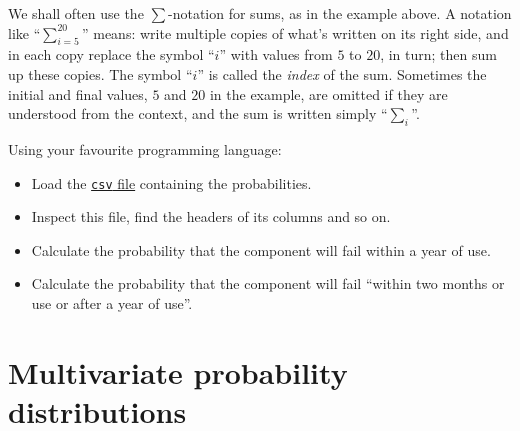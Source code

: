 \documentclass[
  a4paper,
  DIV=11,
  numbers=noendperiod,
  oneside]{scrreprt}
\providecommand{\tightlist}{%
  \setlength{\itemsep}{0pt}\setlength{\parskip}{0pt}}\usepackage{longtable,booktabs,array}
\begin{document}
\begin{tcolorbox}[enhanced jigsaw, opacityback=0, colbacktitle=quarto-callout-note-color!10!white, leftrule=.75mm, colframe=quarto-callout-note-color-frame, titlerule=0mm, rightrule=.15mm, toprule=.15mm, left=2mm, breakable, opacitybacktitle=0.6, toptitle=1mm, bottomtitle=1mm, coltitle=black, arc=.35mm, colback=white, title={Sum notation}, bottomrule=.15mm]

We shall often use the \(\sum\)-notation for sums, as in the example
above. A notation like {``\(\displaystyle\sum_{i=5}^{20}\)''} means:
write multiple copies of what's written on its right side, and in each
copy replace the symbol {``\(i\)''} with values from \(5\) to {\(20\),}
in turn; then sum up these copies. The symbol {``\(i\)''} is called the
\emph{index} of the sum. Sometimes the initial and final values, \(5\)
and \(20\) in the example, are omitted if they are understood from the
context, and the sum is written simply {``\(\displaystyle\sum_{i}\)''.}

\end{tcolorbox}

\begin{tcolorbox}[enhanced jigsaw, opacityback=0, colbacktitle=quarto-callout-caution-color!10!white, leftrule=.75mm, colframe=quarto-callout-caution-color-frame, titlerule=0mm, rightrule=.15mm, toprule=.15mm, left=2mm, breakable, opacitybacktitle=0.6, toptitle=1mm, bottomtitle=1mm, coltitle=black, arc=.35mm, colback=white, title={\faIcon{user-edit} Exercise}, bottomrule=.15mm]

Using your favourite programming language:

\begin{itemize}
\tightlist
\item
  Load the \href{datasets/failure_probability.csv}{\texttt{csv} file}
  containing the probabilities.
\item
  Inspect this file, find the headers of its columns and so on.
\item
  Calculate the probability that the component will fail within a year
  of use.
\item
  Calculate the probability that the component will fail ``within two
  months or use or after a year of use''.
\end{itemize}

\end{tcolorbox}

\hypertarget{multivariate-probability-distributions}{%
\chapter{Multivariate probability
distributions}\label{multivariate-probability-distributions}}
\end{document}

